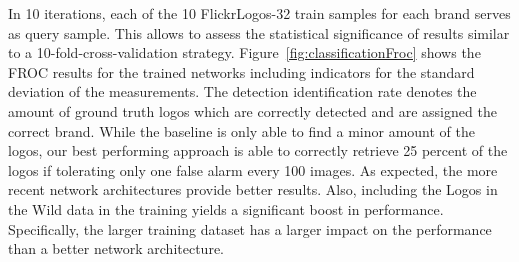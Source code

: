 \documentclass[a4paper,twoside]{article}
\begin{document}
In 10 iterations, each of the 10 FlickrLogos-32 train samples for each brand serves as query sample. This allows to assess the statistical significance of results similar to a 10-fold-cross-validation strategy. Figure~\ref{fig:classificationFroc} shows the FROC results for the trained networks including indicators for the standard deviation of the measurements. The detection identification rate denotes the amount of ground truth logos which are correctly detected and are assigned the correct brand.
While the baseline is only able to find a minor amount of the logos, our best performing approach is able to correctly retrieve 25 percent of the logos if tolerating only one false alarm every 100 images.
As expected, the more recent network architectures provide better results. Also, including the Logos in the Wild data in the training yields a significant boost in performance. Specifically, the larger training dataset has a larger impact on the performance than a better network architecture. 
%
\end{document}
